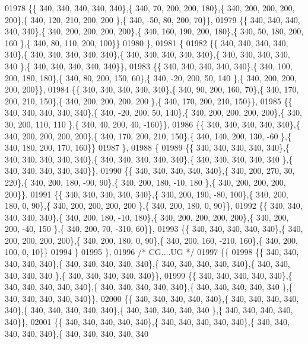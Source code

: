 \begin{DoxyCode}
01978 \{\{ 340, 340, 340, 340, 340\},\{ 340,  70, 200, 200, 180\},\{ 340, 200, 200, 200, 200\},\{ 340, 120, 210, 200, 200
      \},\{ 340, -50,  80, 200,  70\}\},
01979 \{\{ 340, 340, 340, 340, 340\},\{ 340, 200, 200, 200, 200\},\{ 340, 160, 190, 200, 180\},\{ 340,  50, 180, 200, 160
      \},\{ 340,  80, 110, 200, 100\}\}
01980 \},
01981 \{
01982 \{\{ 340, 340, 340, 340, 340\},\{ 340, 340, 340, 340, 340\},\{ 340, 340, 340, 340, 340\},\{ 340, 340, 340, 340, 340
      \},\{ 340, 340, 340, 340, 340\}\},
01983 \{\{ 340, 340, 340, 340, 340\},\{ 340, 100, 200, 180, 180\},\{ 340,  80, 200, 150,  60\},\{ 340, -20, 200,  50, 140
      \},\{ 340, 200, 200, 200, 200\}\},
01984 \{\{ 340, 340, 340, 340, 340\},\{ 340,  90, 200, 160,  70\},\{ 340, 170, 200, 210, 150\},\{ 340, 200, 200, 200, 200
      \},\{ 340, 170, 200, 210, 150\}\},
01985 \{\{ 340, 340, 340, 340, 340\},\{ 340, -20, 200,  50, 140\},\{ 340, 200, 200, 200, 200\},\{ 340,  30, 200, 110, 110
      \},\{ 340,  40, 200,  40, -160\}\},
01986 \{\{ 340, 340, 340, 340, 340\},\{ 340, 200, 200, 200, 200\},\{ 340, 170, 200, 210, 150\},\{ 340, 140, 200, 130, -60
      \},\{ 340, 180, 200, 170, 160\}\}
01987 \},
01988 \{
01989 \{\{ 340, 340, 340, 340, 340\},\{ 340, 340, 340, 340, 340\},\{ 340, 340, 340, 340, 340\},\{ 340, 340, 340, 340, 340
      \},\{ 340, 340, 340, 340, 340\}\},
01990 \{\{ 340, 340, 340, 340, 340\},\{ 340, 200, 270,  30, 220\},\{ 340, 200, 180, -90,  90\},\{ 340, 200, 180, -10, 180
      \},\{ 340, 200, 200, 200, 200\}\},
01991 \{\{ 340, 340, 340, 340, 340\},\{ 340, 200, 190, -80, 100\},\{ 340, 200, 180,   0,  90\},\{ 340, 200, 200, 200, 200
      \},\{ 340, 200, 180,   0,  90\}\},
01992 \{\{ 340, 340, 340, 340, 340\},\{ 340, 200, 180, -10, 180\},\{ 340, 200, 200, 200, 200\},\{ 340, 200, 200, -40, 150
      \},\{ 340, 200,  70, -310,  60\}\},
01993 \{\{ 340, 340, 340, 340, 340\},\{ 340, 200, 200, 200, 200\},\{ 340, 200, 180,   0,  90\},\{ 340, 200, 160, -210, 
      160\},\{ 340, 200, 100,   0,  10\}\}
01994 \}
01995 \},
01996 \textcolor{comment}{/* CG....UG */}
01997 \{\{
01998 \{\{ 340, 340, 340, 340, 340\},\{ 340, 340, 340, 340, 340\},\{ 340, 340, 340, 340, 340\},\{ 340, 340, 340, 340, 340
      \},\{ 340, 340, 340, 340, 340\}\},
01999 \{\{ 340, 340, 340, 340, 340\},\{ 340, 340, 340, 340, 340\},\{ 340, 340, 340, 340, 340\},\{ 340, 340, 340, 340, 340
      \},\{ 340, 340, 340, 340, 340\}\},
02000 \{\{ 340, 340, 340, 340, 340\},\{ 340, 340, 340, 340, 340\},\{ 340, 340, 340, 340, 340\},\{ 340, 340, 340, 340, 340
      \},\{ 340, 340, 340, 340, 340\}\},
02001 \{\{ 340, 340, 340, 340, 340\},\{ 340, 340, 340, 340, 340\},\{ 340, 340, 340, 340, 340\},\{ 340, 340, 340, 340, 340

\end{DoxyCode}

